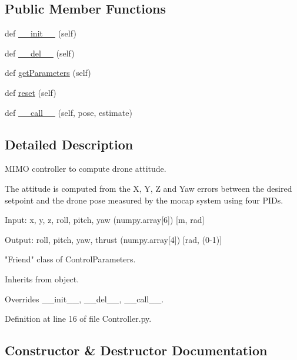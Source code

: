 \subsection*{Public Member Functions}
\begin{DoxyCompactItemize}
\item 
def \mbox{\hyperlink{classwindshape_1_1drone_1_1control_1_1_controller_1_1_controller_aa02a0cded906a0dbfb675de7143d83e6}{\+\_\+\+\_\+init\+\_\+\+\_\+}} (self)
\item 
def \mbox{\hyperlink{classwindshape_1_1drone_1_1control_1_1_controller_1_1_controller_a1a086d0027466c15d2fbf64f7b74291b}{\+\_\+\+\_\+del\+\_\+\+\_\+}} (self)
\item 
def \mbox{\hyperlink{classwindshape_1_1drone_1_1control_1_1_controller_1_1_controller_a02b5b4f02801fb76acaa744686fc9342}{get\+Parameters}} (self)
\item 
def \mbox{\hyperlink{classwindshape_1_1drone_1_1control_1_1_controller_1_1_controller_a94c618838ae2420a234f0d9d884c36d4}{reset}} (self)
\item 
def \mbox{\hyperlink{classwindshape_1_1drone_1_1control_1_1_controller_1_1_controller_a4ba4d98a9925ce20b7f3741c1eb9b3f4}{\+\_\+\+\_\+call\+\_\+\+\_\+}} (self, pose, estimate)
\end{DoxyCompactItemize}


\subsection{Detailed Description}
\begin{DoxyVerb}MIMO controller to compute drone attitude.

The attitude is computed from the X, Y, Z and Yaw errors between the
desired setpoint and the drone pose measured by the mocap system
using four PIDs.

Input: x, y, z, roll, pitch, yaw (numpy.array[6]) [m, rad]

Output: roll, pitch, yaw, thrust (numpy.array[4]) [rad, (0-1)]

"Friend" class of ControlParameters.

Inherits from object.

Overrides __init__, __del__, __call__.
\end{DoxyVerb}
 

Definition at line 16 of file Controller.\+py.



\subsection{Constructor \& Destructor Documentation}
\mbox{\label{classwindshape_1_1drone_1_1control_1_1_controller_1_1_controller_aa02a0cded906a0dbfb675de7143d83e6}} 
